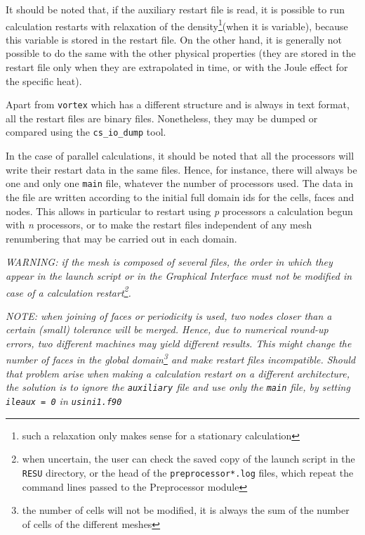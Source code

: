 {{{It should be noted that, if the auxiliary restart file is read, it is
possible to run calculation restarts with relaxation of the
density\footnote{such a relaxation only makes sense for a stationary
calculation}(when it is variable), because this variable is stored in the
restart file. On the other hand, it is generally not possible to do the
same with the other physical properties (they are stored in the restart
file only when they are extrapolated in time, or with the Joule effect for the
specific heat).

Apart from \texttt{vortex} which has a different structure and is
always in text format, all the restart files are binary
files. Nonetheless, they may be dumped or compared using
the \texttt{cs\_io\_dump} tool.

In the case of parallel calculations, it should be noted that all the processors
will write their restart data in the same files. Hence, for instance, there will
always be one and only one \texttt{main} file, whatever the number of
processors used. The data in the file are written according to the initial full
domain ids for the cells, faces and nodes. This allows in particular
to restart using {\it p} processors a calculation begun with {\it n} processors,
or to make the restart files independent of any mesh renumbering that may
be carried out in each domain.

{\em WARNING: if the mesh is composed of several files, the order
in which they appear in the launch script or in the Graphical Interface must not
be modified in case of a calculation restart\footnote{when uncertain, the user
can check the saved copy of the launch script in the \texttt{RESU} directory, or
the head of the \texttt{preprocessor*.log} files, which repeat the
command lines passed to the Preprocessor module}.}

{\em NOTE: when joining of faces or periodicity is used, two nodes closer
than a certain (small) tolerance will be merged. Hence, due to numerical
round-up errors, two different machines may yield different results.
This might change the number of faces in the global
domain\footnote{the number of cells will not be modified, it is always the sum of the
number of cells of the different meshes} and make restart files
incompatible. Should that problem arise when making a calculation restart on a
different architecture, the solution is to ignore the \texttt{auxiliary}
file and use only the \texttt{main} file, by setting \texttt{ileaux = 0}
in \texttt{usini1.f90}}

}}}
